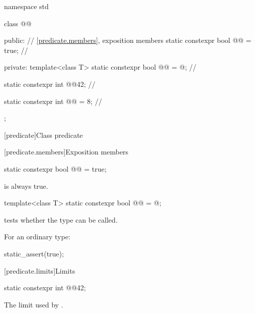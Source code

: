 \begin{codeblock}
namespace std {
  class @@ {
  public:
    // \ref{predicate.members}, exposition members
    static constexpr bool @@ = true; // \expos

  private:
    template<class T> static constexpr bool @@ = @\seebelow@; // \expos

    static constexpr int @@{42}; // \expos

    static constexpr int @@ = 8; // \expos
  };
}
\end{codeblock}

[predicate]{Class predicate}

[predicate.members]{Exposition members}

\begin{itemdecl}
static constexpr bool @@ = true;
\end{itemdecl}

\begin{itemdescr}
\pnum
\remarks
{} is always true.
\end{itemdescr}

\begin{itemdecl}
template<class T>
  static constexpr bool @@ = @\seebelow@;
\end{itemdecl}

\begin{itemdescr}
\pnum
{} tests whether the type can be called.
\begin{example}
For an ordinary type:

\begin{codeblock}
static_assert(true);
\end{codeblock}
\end{example}
\end{itemdescr}

[predicate.limits]{Limits}

\begin{itemdecl}
static constexpr int @@{42};
\end{itemdecl}

\begin{itemdescr}
\pnum
\remarks
The limit used by .
\end{itemdescr}
